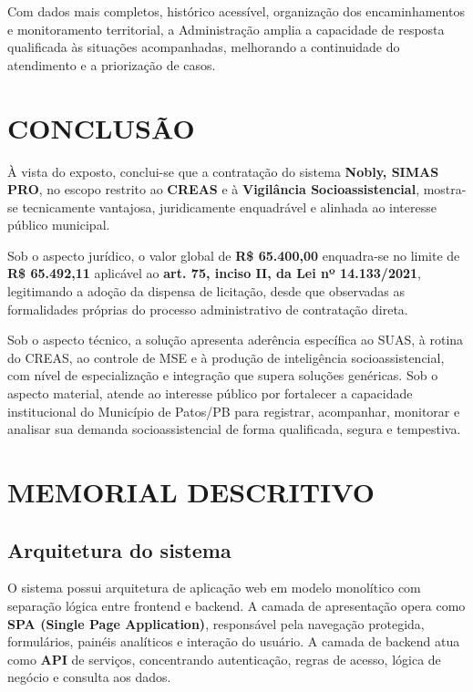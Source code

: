 \documentclass[12pt,a4paper]{article}
\begin{document}
Com dados mais completos, histórico acessível, organização dos encaminhamentos e monitoramento territorial, a Administração amplia a capacidade de resposta qualificada às situações acompanhadas, melhorando a continuidade do atendimento e a priorização de casos.

\section{CONCLUSÃO}

À vista do exposto, conclui-se que a contratação do sistema \textbf{Nobly, SIMAS PRO}, no escopo restrito ao \textbf{CREAS} e à \textbf{Vigilância Socioassistencial}, mostra-se tecnicamente vantajosa, juridicamente enquadrável e alinhada ao interesse público municipal.

Sob o aspecto jurídico, o valor global de \textbf{R\$ 65.400,00} enquadra-se no limite de \textbf{R\$ 65.492,11} aplicável ao \textbf{art. 75, inciso II, da Lei nº 14.133/2021}, legitimando a adoção da dispensa de licitação, desde que observadas as formalidades próprias do processo administrativo de contratação direta.

Sob o aspecto técnico, a solução apresenta aderência específica ao SUAS, à rotina do CREAS, ao controle de MSE e à produção de inteligência socioassistencial, com nível de especialização e integração que supera soluções genéricas. Sob o aspecto material, atende ao interesse público por fortalecer a capacidade institucional do Município de Patos/PB para registrar, acompanhar, monitorar e analisar sua demanda socioassistencial de forma qualificada, segura e tempestiva.

\section{MEMORIAL DESCRITIVO}

\subsection{Arquitetura do sistema}

O sistema possui arquitetura de aplicação web em modelo monolítico com separação lógica entre frontend e backend. A camada de apresentação opera como \textbf{SPA (Single Page Application)}, responsável pela navegação protegida, formulários, painéis analíticos e interação do usuário. A camada de backend atua como \textbf{API} de serviços, concentrando autenticação, regras de acesso, lógica de negócio e consulta aos dados.
\end{document}
